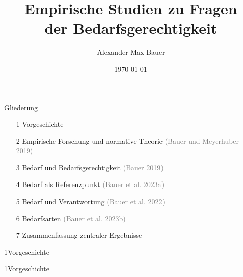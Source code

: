 \documentclass[xcolor=table,9pt,aspectratio=169]{beamer}
\title{Empirische Studien zu Fragen\\der Bedarfsgerechtigkeit}
\subtitle{}
\author{Alexander Max Bauer}
\date{\renewcommand{\dateseparator}{.}\ddmmyyyydate\today}
\begin{document}
{
\begin{frame}
   \maketitle
\end{frame}
}


\begin{frame}{\vspace*{10mm}Gliederung}
\begin{itemize}
   \item[1] \hspace*{1em}Vorgeschichte
   \item[2] \hspace*{1em}Empirische Forschung und normative Theorie \textcolor{gray}{(Bauer und Meyerhuber 2019)}
   \item[3] \hspace*{1em}Bedarf und Bedarfsgerechtigkeit \textcolor{gray}{(Bauer 2019)}
   \item[4] \hspace*{1em}Bedarf als Referenzpunkt \textcolor{gray}{(Bauer et al. 2023a)}
   \item[5] \hspace*{1em}Bedarf und Verantwortung \textcolor{gray}{(Bauer et al. 2022)}
   \item[6] \hspace*{1em}Bedarfsarten \textcolor{gray}{(Bauer et al. 2023b)}
   \item[7] \hspace*{1em}Zusammenfassung zentraler Ergebnisse
\end{itemize}
\end{frame}


\begin{frame}
\begin{overlayarea}{\textwidth}{0.81\paperheight}{
   \vspace*{11mm}
   \textcolor{uolblue}
   {1\hspace*{1em}Vorgeschichte}
}
\vspace*{7mm}
\end{overlayarea}
\end{frame}


\begin{frame}{\vspace*{10mm}1\hspace*{1em}Vorgeschichte}
\end{frame}
\end{document}
